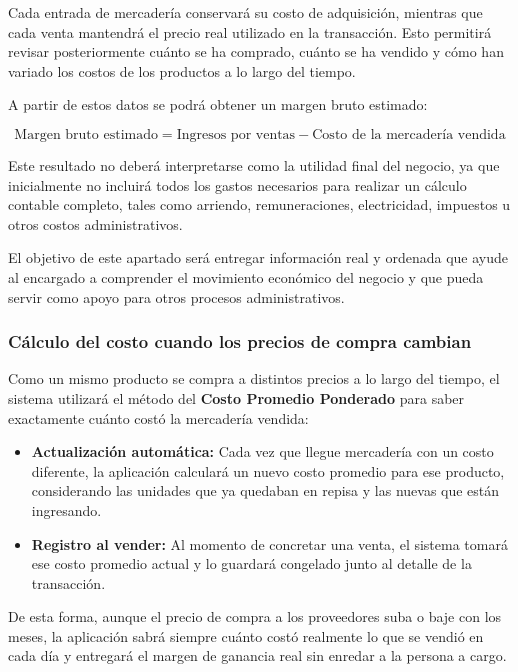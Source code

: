 \documentclass[10pt,a4paper]{article}
\begin{document}
Cada entrada de mercadería conservará su costo de adquisición, mientras que cada venta mantendrá el precio real utilizado en la transacción. Esto permitirá revisar posteriormente cuánto se ha comprado, cuánto se ha vendido y cómo han variado los costos de los productos a lo largo del tiempo.

A partir de estos datos se podrá obtener un margen bruto estimado:

\begin{equation}
\text{Margen bruto estimado}
=
\text{Ingresos por ventas}
-
\text{Costo de la mercadería vendida}
\end{equation}

Este resultado no deberá interpretarse como la utilidad final del negocio, ya que inicialmente no incluirá todos los gastos necesarios para realizar un cálculo contable completo, tales como arriendo, remuneraciones, electricidad, impuestos u otros costos administrativos.

El objetivo de este apartado será entregar información real y ordenada que ayude al encargado a comprender el movimiento económico del negocio y que pueda servir como apoyo para otros procesos administrativos.

\subsubsection{Cálculo del costo cuando los precios de compra cambian}

Como un mismo producto se compra a distintos precios a lo largo del tiempo, el sistema utilizará el método del \textbf{Costo Promedio Ponderado} para saber exactamente cuánto costó la mercadería vendida:

\begin{itemize}
    \item \textbf{Actualización automática:} Cada vez que llegue mercadería con un costo diferente, la aplicación calculará un nuevo costo promedio para ese producto, considerando las unidades que ya quedaban en repisa y las nuevas que están ingresando.
    \item \textbf{Registro al vender:} Al momento de concretar una venta, el sistema tomará ese costo promedio actual y lo guardará congelado junto al detalle de la transacción.
\end{itemize}

De esta forma, aunque el precio de compra a los proveedores suba o baje con los meses, la aplicación sabrá siempre cuánto costó realmente lo que se vendió en cada día y entregará el margen de ganancia real sin enredar a la persona a cargo.
\end{document}
